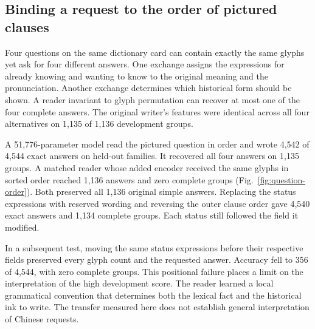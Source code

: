 \subsection*{Binding a request to the order of pictured clauses}
Four questions on the same dictionary card can contain exactly the same glyphs yet ask for four different answers. One exchange assigns the expressions for already knowing and wanting to know to the original meaning and the pronunciation. Another exchange determines which historical form should be shown. A reader invariant to glyph permutation can recover at most one of the four complete answers. The original writer's features were identical across all four alternatives on 1,135 of 1,136 development groups.

A 51,776-parameter model read the pictured question in order and wrote 4,542 of 4,544 exact answers on held-out families. It recovered all four answers on 1,135 groups. A matched reader whose added encoder received the same glyphs in sorted order reached 1,136 answers and zero complete groups (Fig.~\ref{fig:question-order}). Both preserved all 1,136 original simple answers. Replacing the status expressions with reserved wording and reversing the outer clause order gave 4,540 exact answers and 1,134 complete groups. Each status still followed the field it modified.

In a subsequent test, moving the same status expressions before their respective fields preserved every glyph count and the requested answer. Accuracy fell to 356 of 4,544, with zero complete groups. This positional failure places a limit on the interpretation of the high development score. The reader learned a local grammatical convention that determines both the lexical fact and the historical ink to write. The transfer measured here does not establish general interpretation of Chinese requests.
